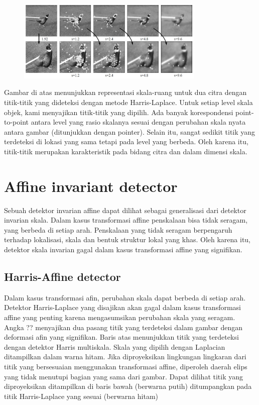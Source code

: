 \begin{figure}
  \centering{}
  \includegraphics[width=0.8\textwidth]{gambar/Point detect.jpg}
  \caption{}
\end{figure}

Gambar di atas menunjukkan representasi skala-ruang untuk dua citra dengan titik-titik yang dideteksi dengan metode Harris-Laplace. Untuk setiap level skala objek, kami menyajikan titik-titik yang dipilih. Ada banyak korespondensi point-to-point antara level yang rasio skalanya sesuai dengan perubahan skala nyata antara gambar (ditunjukkan dengan pointer). Selain itu, sangat sedikit titik yang terdeteksi di lokasi yang sama tetapi pada level yang berbeda. Oleh karena itu, titik-titik merupakan karakteristik pada bidang citra dan dalam dimensi skala.

\section{\textbf{Affine invariant detector}}
Sebuah detektor invarian affine dapat dilihat sebagai generalisasi dari detektor invarian skala. Dalam kasus transformasi affine penskalaan bisa tidak seragam, yang berbeda di setiap arah. Penskalaan yang tidak seragam berpengaruh terhadap lokalisasi, skala dan bentuk struktur lokal yang khas. Oleh karena itu, detektor skala invarian gagal dalam kasus transformasi affine yang signifikan.

\subsection{\textbf{Harris-Affine detector}}
Dalam kasus transformasi afin, perubahan skala dapat berbeda di setiap arah. Detektor Harris-Laplace yang disajikan akan gagal dalam kasus transformasi affine yang penting karena mengasumsikan perubahan skala yang seragam. Angka ?? menyajikan dua pasang titik yang terdeteksi dalam gambar dengan deformasi afin yang signifikan. Baris atas menunjukkan titik yang terdeteksi dengan detektor Harris multiskala. Skala yang dipilih dengan Laplacian ditampilkan dalam warna hitam. Jika diproyeksikan lingkungan lingkaran dari titik yang bersesuaian menggunakan transformasi affine, diperoleh daerah elips yang tidak menutupi bagian yang sama dari gambar. Dapat dilihat titik yang diproyeksikan ditampilkan di baris bawah (berwarna putih) ditumpangkan pada titik Harris-Laplace yang sesuai (berwarna hitam)

